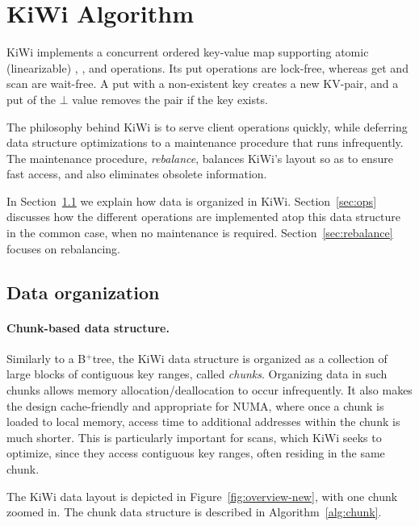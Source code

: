 \section{KiWi Algorithm}
\label{sec:alg}

KiWi implements a concurrent ordered key-value map supporting atomic (linearizable) , , and  operations.
Its put operations are lock-free, whereas get and scan are wait-free. A put with a non-existent key creates a new KV-pair, and a put of the $\bot$ value removes the pair if the key exists.

The philosophy behind KiWi is to serve client operations quickly, while deferring data structure optimizations to a
maintenance procedure that runs infrequently. The maintenance procedure, \emph{rebalance}, balances KiWi's layout so as to ensure fast
access, and also eliminates obsolete information.

In Section~\ref{sec:organization}  we explain how data is organized in KiWi.   Section~\ref{sec:ops} discusses how the different operations are implemented atop this data structure in the common case, 
when no maintenance is required.
Section~\ref{sec:rebalance} focuses on rebalancing.


\subsection{Data organization}
\label{sec:organization}

\paragraph{Chunk-based data structure.}
Similarly to a B$^{+}$tree, the KiWi data structure is organized as a collection of large blocks of contiguous key ranges, called \emph{chunks}. Organizing data in such chunks allows memory allocation/deallocation to occur infrequently. It also makes the design cache-friendly and appropriate for NUMA, where once a chunk is loaded to local memory, access time to additional addresses within the chunk is much shorter. This is particularly important for  scans, which KiWi seeks to optimize, since they access contiguous key ranges, often residing in the same chunk.

The KiWi data layout is depicted in Figure~\ref{fig:overview-new}, with one chunk zoomed in.
The chunk data structure is described in Algorithm~\ref{alg:chunk}.

